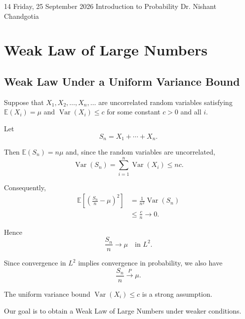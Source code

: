
\lecture
{14}
{Friday, 25 September 2026}
{Introduction to Probability}
{Dr. Nishant Chandgotia}



\section{Weak Law of Large Numbers}

\subsection{Weak Law Under a Uniform Variance Bound}

Suppose that
\(
X_1,X_2,\ldots,X_n,\ldots
\)
are uncorrelated random variables satisfying
\(
\mathbb{E}(X_i)=\mu
\)
and
\(
\operatorname{Var}(X_i)\leq c
\)
for some constant $c>0$ and all $i$.

Let
\[
S_n=X_1+\cdots+X_n.
\]

Then
\(
\mathbb{E}(S_n)=n\mu
\)
and, since the random variables are uncorrelated,
\[
\operatorname{Var}(S_n)
=
\sum_{i=1}^n\operatorname{Var}(X_i)
\leq nc.
\]

Consequently,
\[
\begin{aligned}
\mathbb{E}
\left[
\left(
\frac{S_n}{n}-\mu
\right)^2
\right]
&=
\frac{1}{n^2}
\operatorname{Var}(S_n)\\
&\leq
\frac{c}{n}
\longrightarrow0.
\end{aligned}
\]

Hence
\[
\boxed{
\frac{S_n}{n}\longrightarrow\mu
\quad\text{in }L^2.
}
\]

Since convergence in $L^2$ implies convergence in probability,
we also have
\[
\boxed{
\frac{S_n}{n}\xrightarrow{P}\mu.
}
\]

\begin{observation}

The uniform variance bound
\(
\operatorname{Var}(X_i)\leq c
\)
is a strong assumption.

Our goal is to obtain a Weak Law of Large Numbers under weaker
conditions.

\end{observation}




